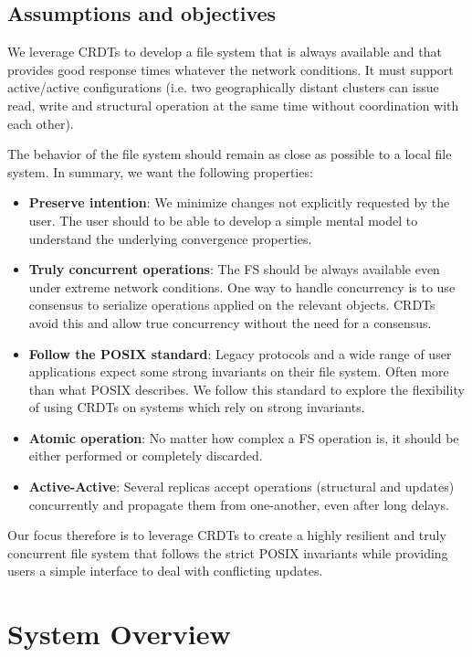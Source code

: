 \documentclass[sigconf, 10pt]{acmart}
\begin{document}
\subsection{Assumptions and objectives}

We leverage CRDTs to develop a file system that is always available
and that provides good response times whatever the network conditions.
It must support active/active configurations
(i.e. two geographically distant clusters can issue read, write and structural
operation at the same time without coordination with each other).

The behavior of the file system should remain as close as possible to a local file system.
In summary, we want the following properties:

\begin{itemize}
	\item \textbf{Preserve intention}: We minimize changes not explicitly requested by the user.
	The user should to be able to develop a simple mental model to understand
	the underlying convergence properties.
	\item \textbf{Truly concurrent operations}: The FS should be always available even under extreme network conditions.
	One way to handle concurrency
	is to use consensus to serialize operations applied on the relevant objects.
	CRDTs avoid this and allow true concurrency without the need for a consensus.
	\item \textbf{Follow the POSIX standard}: Legacy protocols and a wide range of user applications expect some strong invariants on their file system. Often more than what POSIX describes. We follow this standard to explore the flexibility of using CRDTs on systems which rely on strong invariants.
	\item \textbf{Atomic operation}: No matter how complex a FS operation is, it should be either performed or completely discarded.
	\item \textbf{Active-Active}: Several replicas accept operations
	(structural and updates) concurrently and propagate them from one-another,
	even after long delays.
\end{itemize}

Our focus therefore is to leverage CRDTs to create a highly resilient and
truly concurrent file system that follows the strict POSIX invariants
while providing users a simple interface to deal with conflicting updates.

\section{System Overview}
\end{document}
